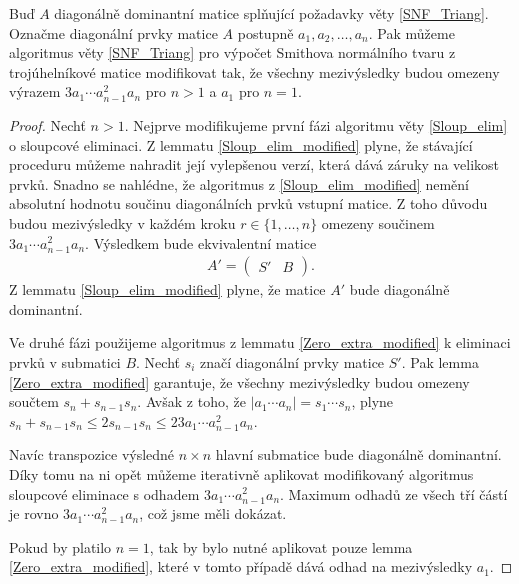 \begin{vet}
Buď $ A $ diagonálně dominantní matice splňující požadavky věty \ref{SNF_Triang}.
Označme diagonální prvky matice $ A $ postupně $ a_1, a_2, \dots, a_n $.
Pak můžeme algoritmus věty \ref{SNF_Triang} pro výpočet Smithova normálního 
tvaru z trojúhelníkové matice modifikovat tak, že všechny mezivýsledky budou 
omezeny výrazem $ 3 a_1 \cdots a_{n - 1}^2 a_n $ pro $ n > 1 $ a $ a_1 $ 
pro $ n = 1 $.
\end{vet}
\begin{proof}
Nechť $ n > 1 $.
Nejprve modifikujeme první fázi algoritmu věty \ref{Sloup_elim} o sloupcové 
eliminaci. Z lemmatu \ref{Sloup_elim_modified} plyne, že stávající proceduru 
můžeme nahradit její vylepšenou verzí, která dává záruky na velikost prvků. 
Snadno se nahlédne, že  algoritmus z \ref{Sloup_elim_modified} nemění absolutní 
hodnotu součinu  diagonálních prvků vstupní matice. Z toho důvodu budou 
mezivýsledky v  každém kroku $ r \in \{1, \dots, n \} $ omezeny součinem 
$ 3 a_1 \cdots a_{n - 1}^2 a_n $.
Výsledkem bude ekvivalentní matice
\begin{align*}
A' =
    \left(
    \begin{array}{c|c}
        S' & B
    \end{array}
    \right)
.
\end{align*}
Z lemmatu \ref{Sloup_elim_modified} plyne, že matice $ A' $ bude diagonálně
dominantní.

Ve druhé fázi použijeme algoritmus z lemmatu \ref{Zero_extra_modified}
k eliminaci prvků v submatici $ B $. Nechť $ s_i $ značí diagonální prvky matice 
$ S' $. Pak lemma \ref{Zero_extra_modified} garantuje, že všechny mezivýsledky 
budou omezeny součtem $ s_n + s_{n - 1} s_n $. Avšak z toho, že 
$ |a_1 \cdots a_n| = s_1 \cdots s_n $, plyne 
$ s_n + s_{n - 1} s_n \leq 2 s_{n - 1} s_n \leq 2 3 a_1 \cdots a_{n - 1}^2 a_n $.

Navíc transpozice výsledné $ n \times n $ hlavní submatice bude diagonálně 
dominantní. Díky tomu na ni opět můžeme iterativně aplikovat modifikovaný 
algoritmus sloupcové eliminace s odhadem $ 3 a_1 \cdots a_{n - 1}^2 a_n $.
Maximum odhadů ze všech tří částí je rovno $ 3 a_1 \cdots a_{n - 1}^2 a_n $, 
což jsme měli dokázat.

Pokud by platilo $ n = 1 $, tak by bylo nutné aplikovat pouze lemma 
\ref{Zero_extra_modified}, které v tomto případě dává odhad na mezivýsledky
$ a_1 $.
\end{proof}








